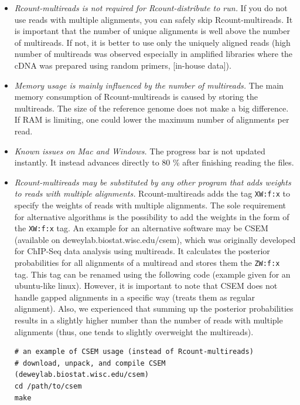 \documentclass[a4paper,10pt]{article}
\begin{document}
\begin{itemize}
 \item \textit{Rcount-multireads is not required for Rcount-distribute to run.} \newline
If you do not use reads with multiple alignments, you can safely skip Rcount-multireads. It is important that the number of unique alignments is well above the number of multireads. If not, it is better to use only the uniquely aligned reads (high number of multireads was observed especially in amplified libraries where the cDNA was prepared using random primers, [in-house data]).
 \item \textit{Memory usage is mainly influenced by the number of multireads.} \newline
The main memory consumption of Rcount-multireads is caused by storing the multireads. The size of the reference genome does not make a big difference. If RAM is limiting, one could lower the maximum number of alignments per read. 
 \item \textit{Known issues on Mac and Windows.} \newline
The progress bar is not updated instantly. It instead advances directly to 80 \% after finishing reading the files.
 \item \textit{Rcount-multireads may be substituted by any other program that adds weights to reads with multiple alignments.} \newline
Rcount-multireads adds the tag \texttt{XW:f:x} to specify the weights of reads with multiple alignments. The sole requirement for alternative algorithms is the possibility to add the weights in the form of the \texttt{XW:f:x} tag. An example for an alternative software may be CSEM \cite{2011_Chung} (available on deweylab.biostat.wisc.edu/csem), which was originally developed for ChIP-Seq data analysis using multireads. It calculates the posterior probabilities for all alignments of a multiread and stores them the \texttt{ZW:f:x} tag. This tag can be renamed using the following code (example given for an ubuntu-like linux). However, it is important to note that CSEM does not handle gapped alignments in a specific way (treats them as regular alignment). Also, we experienced that summing up the posterior probabilities results in a slightly higher number than the number of reads with multiple alignments (thus, one tends to slightly overweight the multireads).
\begin{verbatim}
# an example of CSEM usage (instead of Rcount-multireads)
# download, unpack, and compile CSEM (deweylab.biostat.wisc.edu/csem) 
cd /path/to/csem
make


\end{verbatim}
\end{itemize}
\end{document}
